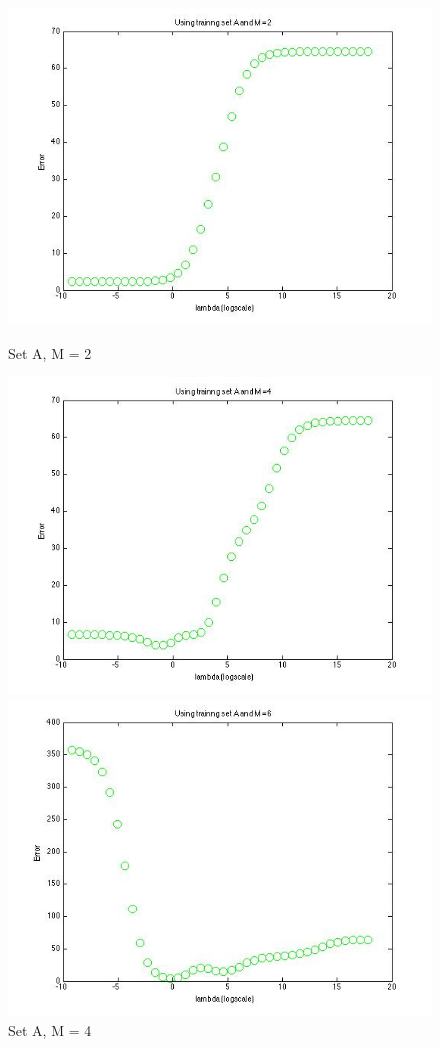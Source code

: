 \begin{figure}[!htb]
  \includegraphics[width=\linewidth]{figures/p3_regressA_m=2}
  \caption{Set A, M = 2}\label{fig:p3_regressA_m=2}
\endminipage\hfill
{}
  \includegraphics[width=\linewidth]{figures/p3_regressA_m=4}
  \caption{Set A, M = 4}\label{fig:p3_regressA_m=4}
\endminipage\hfill
{}%
  \includegraphics[width=\linewidth]{figures/p3_regressA_m=6}

\end{figure}
